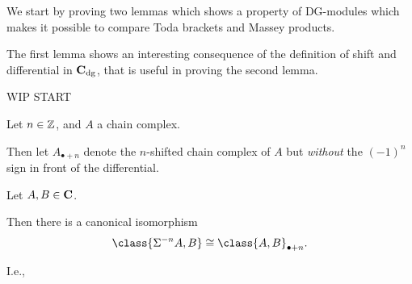 We start by proving two lemmas which shows a property of DG-modules which makes it possible to compare Toda brackets and Massey products.

The first lemma shows an interesting consequence of the definition of shift and differential in \( \operatorname{\mathbf{C}}_{\operatorname{dg}} \), that is useful in proving the second lemma.

WIP START

\begin{notation}
    Let \( n \in {\mathbb{Z}} \), and \( A \) a chain complex.
    
    Then let \( A_{\bullet+n} \) denote the \( n \)-shifted chain complex of \( A \) but \emph{without} the \( (-1)^n \) sign in front of the differential.
\end{notation}

\begin{lemma}
    \label{lem:shift_one_component_inner_product_chain_complex}
    Let \( A, B \in \operatorname{\mathbf{C}} \).

    Then there is a canonical isomorphism
    \[
        \class{\Sigma^{-n} A, B} \cong \class{A, B}_{\bullet+n}.
    \]

    I.e.,
    \begin{center}
    \end{center}
\end{lemma}
